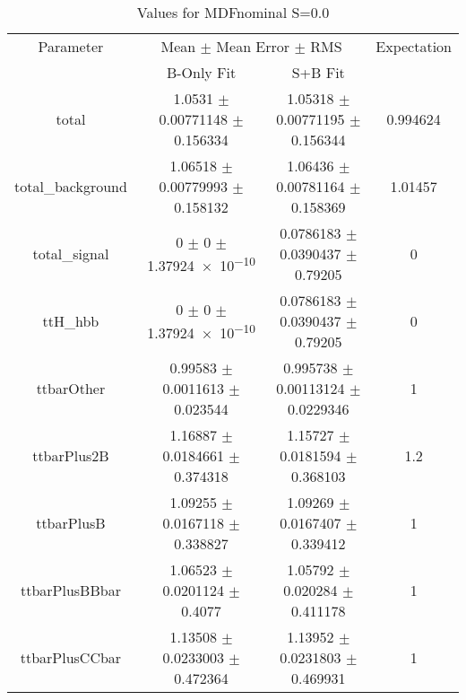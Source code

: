 \begin{table}
\centering
\caption{Values for MDFnominal S=0.0}
\begin{tabular}{cccc}
\toprule
Parameter & \multicolumn{2}{c}{Mean $\pm$ Mean Error $\pm$ RMS} & Expectation\\
 & B-Only Fit & S+B Fit & \\
\midrule
total & \num{1.0531} $\pm$ \num{0.00771148} $\pm$ \num{0.156334} & \num{1.05318} $\pm$ \num{0.00771195} $\pm$ \num{0.156344} & \num{0.994624}\\
total\_background & \num{1.06518} $\pm$ \num{0.00779993} $\pm$ \num{0.158132} & \num{1.06436} $\pm$ \num{0.00781164} $\pm$ \num{0.158369} & \num{1.01457}\\
total\_signal & \num{0} $\pm$ \num{0} $\pm$ \num{1.37924e-10} & \num{0.0786183} $\pm$ \num{0.0390437} $\pm$ \num{0.79205} & \num{0}\\
ttH\_hbb & \num{0} $\pm$ \num{0} $\pm$ \num{1.37924e-10} & \num{0.0786183} $\pm$ \num{0.0390437} $\pm$ \num{0.79205} & \num{0}\\
ttbarOther & \num{0.99583} $\pm$ \num{0.0011613} $\pm$ \num{0.023544} & \num{0.995738} $\pm$ \num{0.00113124} $\pm$ \num{0.0229346} & \num{1}\\
ttbarPlus2B & \num{1.16887} $\pm$ \num{0.0184661} $\pm$ \num{0.374318} & \num{1.15727} $\pm$ \num{0.0181594} $\pm$ \num{0.368103} & \num{1.2}\\
ttbarPlusB & \num{1.09255} $\pm$ \num{0.0167118} $\pm$ \num{0.338827} & \num{1.09269} $\pm$ \num{0.0167407} $\pm$ \num{0.339412} & \num{1}\\
ttbarPlusBBbar & \num{1.06523} $\pm$ \num{0.0201124} $\pm$ \num{0.4077} & \num{1.05792} $\pm$ \num{0.020284} $\pm$ \num{0.411178} & \num{1}\\
ttbarPlusCCbar & \num{1.13508} $\pm$ \num{0.0233003} $\pm$ \num{0.472364} & \num{1.13952} $\pm$ \num{0.0231803} $\pm$ \num{0.469931} & \num{1}\\
\bottomrule
\end{tabular}
\end{table}